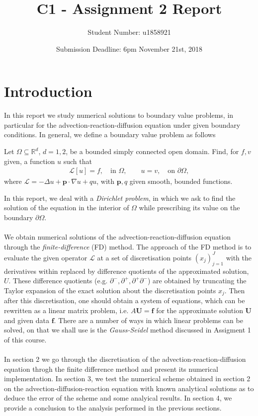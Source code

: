 \documentclass[a4paper,11pt]{article}
\title{C1 - Assignment 2 Report}
\author{Student Number: u1858921}
\date{Submission Deadline: 6pm November 21st, 2018}
\theoremstyle{break}
\theoremstyle{break2}
\theoremstyle{break}
\theoremstyle{break2}
\newcommand{\R}{\mathbb{R}}
\newcommand{\cL}{\mathcal{L}}
\begin{document}
	\maketitle
	\tableofcontents
	
\section{Introduction}
In this report we study numerical solutions to boundary value problems, in particular for the advection-reaction-diffusion equation under given boundary conditions. In general, we define a boundary value problem as follows
\begin{mdframed}[]
	Let $ \Omega \subseteq \R^d $, $ d = 1,2 $, be a bounded simply connected open domain. Find, for $ f,v $ given, a function $ u $ such that
	\begin{align*}
	\cL[u] = f, \quad \text{in } \Omega,\qquad u = v,  \quad \text{on } \partial\Omega,
	\end{align*}
	where $ \cL = -\Delta u + \mathbf{p}\cdot\nabla u + qu $, with $ \mathbf{p},q $ given smooth, bounded functions.
\end{mdframed}
In this report, we deal with a \emph{Dirichlet problem}, in which we ask to find the solution of the equation in the interior of $ \Omega $ while prescribing its value on the boundary $ \partial\Omega $.\\\\
We obtain numerical solutions of the advection-reaction-diffusion equation through the \emph{finite-difference} (FD) method. The approach of the FD method is to evaluate the given operator $ \cL $ at a set of discretisation points $ (x_j)_{j=1}^J $ with the derivatives within replaced by difference quotients of the approximated solution, $ U $. These difference quotients (e.g. $ \partial^-, \partial^+, \partial^+\partial^- $) are obtained by truncating the Taylor expansion of the exact solution about the discretisation points $ x_j $. Then after this discretisation, one should obtain a system of equations, which can be rewritten as a linear matrix problem, i.e. $ A\mathbf{U}=\mathbf{f} $ for the approximate solution $ \mathbf{U} $ and given data $ \mathbf{f} $. There are a number of ways in which linear problems can be solved, on that we shall use is the \emph{Gauss-Seidel} method discussed in Assigment 1 of this course.\\\\
In section 2 we go through the discretisation of the advection-reaction-diffusion equation throgh the finite difference method and present its numerical implementation. In section 3, we test the numerical scheme obtained in section 2 on the advection-diffusion-reaction equation with known analytical solutions as to deduce the error of the scheme and some analyical results. In section 4, we provide a conclusion to the analysis performed in the previous sections.
\end{document}
